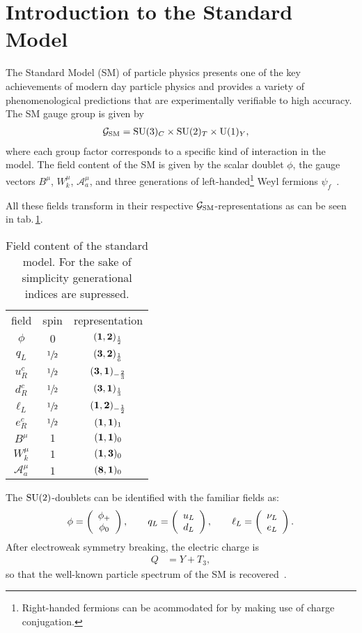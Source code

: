 
\section{Introduction to the Standard Model}\label{sm-basics}
The Standard Model (SM) of particle physics presents one of the key achievements of modern day particle physics and provides a variety of phenomenological predictions that are experimentally verifiable to high accuracy.
The SM gauge group is given by
\begin{align}\label{gsm}
  \mathcal{G}_\mathrm{SM}&=\mathrm{SU}(3)_C\times\mathrm{SU}(2)_T\times\mathrm{U}(1)_Y,
\end{align}
where each group factor corresponds to a specific kind of interaction in the model.
The field content of the SM is given by the scalar doublet $\phi$, the gauge vectors $B^\mu$, $W_k^\mu$, $\mathcal{A}_a^\mu$, and three generations of left-handed\footnote{Right-handed fermions can be acommodated for by making use of charge conjugation.} Weyl fermions $\psi_f$~\cite{arthur, pdg}.

\noindent All these fields transform in their respective $\mathcal{G}_\mathrm{SM}$-representations as can be seen in tab.\,\ref{sm-fields}.
\begin{table}[H]\centering
\caption{Field content of the standard model. For the sake of simplicity generational indices are supressed.\label{sm-fields}}
\begin{tabular}{ccc}
field& spin& representation\\
$\phi$&$0$&$(\mathbf{1}, \mathbf{2})_{\frac12}$\\
$q_L$&$\sfrac12$&$(\mathbf{3}, \mathbf{2})_{\frac16}$\\
$u_R^c$&$\sfrac12$&$(\mathbf{3}, \mathbf{1})_{-\frac23}$\\
$d_R^c$&$\sfrac12$&$(\mathbf{3}, \mathbf{1})_{\frac13}$\\
$\ell_L$&$\sfrac12$&$(\mathbf{1}, \mathbf{2})_{-\frac12}$\\
$e_R^c$&$\sfrac12$&$(\mathbf{1}, \mathbf{1})_{1}$\\
$B^\mu$&$1$&$(\mathbf{1}, \mathbf{1})_{0}$\\
$W_k^\mu$&$1$&$(\mathbf{1}, \mathbf{3})_{0}$\\
$\mathcal{A}_a^\mu$&$1$&$(\mathbf{8}, \mathbf{1})_{0}$
\end{tabular}
\end{table}
The $\mathrm{SU}(2)$-doublets can be identified with the familiar fields as:
\begin{align}
\phi=\left(\begin{array}{c}\phi_+\\\phi_0\end{array}\right),\quad\quad q_L=\left(\begin{array}{c}u_L\\d_L\end{array}\right),\quad\quad\ell_L=\left(\begin{array}{c}\nu_L\\e_L\end{array}\right).
\end{align}
After electroweak symmetry breaking, the electric charge is
\begin{align}
Q&=Y+T_3,
\end{align}
so that the well-known particle spectrum of the SM is recovered~\cite{arthur, pdg}.

